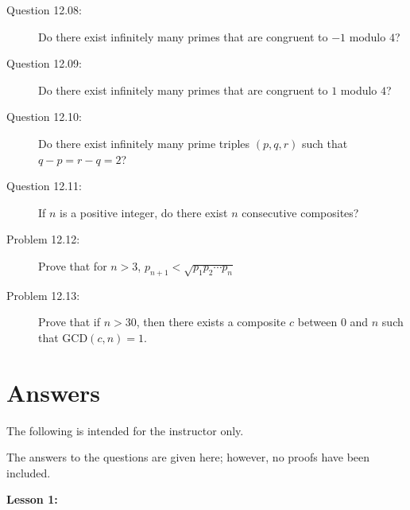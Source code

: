 \documentclass{article}
\begin{document}
\begin{description}
  \item[Question 12.08:] Do there exist infinitely many primes that are congruent to $-1$ modulo $4$?

  \item[Question 12.09:] Do there exist infinitely many primes that are congruent to $1$ modulo $4$?

  \item[Question 12.10:] Do there exist infinitely many prime triples $(p,q,r)$ such that $q-p = r-q = 2$?

  \item[Question 12.11:] If $n$ is a positive integer, do there exist $n$ consecutive composites?

  \item[Problem 12.12:] Prove that for $n>3$, $p_{n+1} < \sqrt{p_1 p_2 \cdots p_n}$

  \item[Problem 12.13:] Prove that if $n>30$, then there exists a composite $c$ between $0$ and $n$ such that $\text{GCD}(c, n) = 1$.

\end{description}


\newpage

\section*{Answers}

The following is intended for the instructor only.
\vspace{0.5cm}

The answers to the questions are given here; however, no proofs have been included.
\vspace{0.5cm}

\textbf{Lesson 1:}
\end{document}
